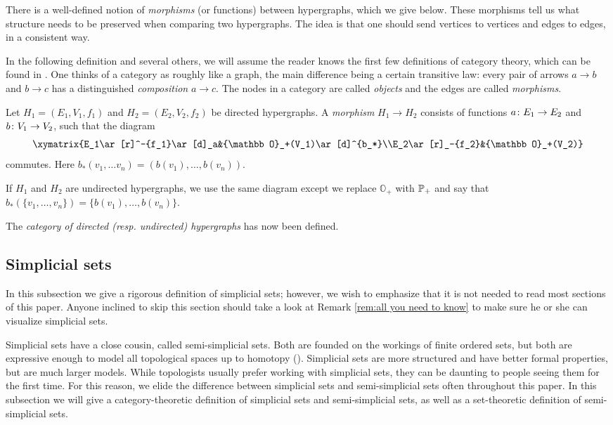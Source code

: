 \documentclass{amsart}
\def\OO{{\mathbb O}}
\begin{document}
There is a well-defined notion of {\em morphisms} (or functions) between hypergraphs, which we give below.  These morphisms tell us what structure needs to be preserved when comparing two hypergraphs.  The idea is that one should send vertices to vertices and edges to edges, in a consistent way.

In the following definition and several others, we will assume the reader knows the first few definitions of category theory, which can be found in \cite{MacLane}.  One thinks of a category as roughly like a graph, the main difference being a certain transitive law: every pair of arrows $a\to b$ and $b\to c$ has a distinguished {\em composition} $a\to c$.  The nodes in a category are called {\em objects} and the edges are called {\em morphisms}.

\begin{definition}

Let $H_1=(E_1,V_1,f_1)$ and $H_2=(E_2,V_2,f_2)$ be directed hypergraphs.  A {\em morphism} $H_1\to H_2$ consists of functions $a\colon E_1\rightarrow E_2$ and $b\colon V_1\rightarrow V_2$, such that the diagram $$\xymatrix{E_1\ar[r]^-{f_1}\ar[d]_a&\OO_+(V_1)\ar[d]^{b_*}\\E_2\ar[r]_-{f_2}&\OO_+(V_2)}$$ commutes.  Here $b_*(v_1,\ldots v_n)=(b(v_1),\ldots,b(v_n))$.

If $H_1$ and $H_2$ are undirected hypergraphs, we use the same diagram except we replace $\OO_+$ with ${\mathbb P}_+$ and say that $b_*(\{v_1,\ldots,v_n\})=\{b(v_1),\ldots,b(v_n)\}$.

The {\em category of directed ({\tn resp.} undirected) hypergraphs} has now been defined.

\end{definition}

\subsection{Simplicial sets}

In this subsection we give a rigorous definition of simplicial sets; however, we wish to emphasize that it is not needed to read most sections of this paper.  Anyone inclined to skip this section should take a look at Remark \ref{rem:all you need to know} to make sure he or she can visualize simplicial sets.

Simplicial sets have a close cousin, called semi-simplicial sets.  Both are founded on the workings of finite ordered sets, but both are expressive enough to model all topological spaces up to homotopy (\cite{}).  Simplicial sets are more structured and have better formal properties, but are much larger models.  While topologists usually prefer working with simplicial sets, they can be daunting to people seeing them for the first time.  For this reason, we elide the difference between simplicial sets and semi-simplicial sets often throughout this paper.   In this subsection we will give a category-theoretic definition of simplicial sets and semi-simplicial sets, as well as a set-theoretic definition of semi-simplicial sets. 
\end{document}
